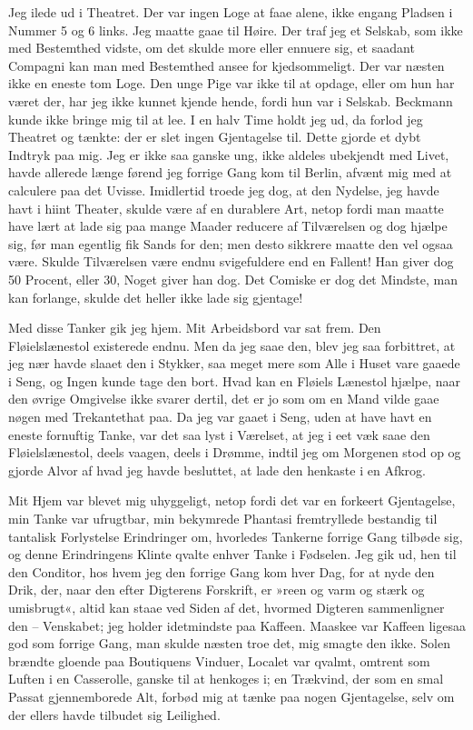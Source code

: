 \documentclass[12pt,a4paper]{article}
\begin{document}
Jeg ilede ud i Theatret. Der var ingen Loge at faae alene, ikke engang Pladsen i Nummer 5 og 6 links. Jeg maatte gaae til Høire. Der traf jeg et Selskab, som ikke med Bestemthed vidste, om det skulde more eller ennuere sig, et saadant Compagni kan man med Bestemthed ansee for kjedsommeligt. Der var næsten ikke en eneste tom Loge. Den unge Pige var ikke til at opdage, eller om hun har været der, har jeg ikke kunnet kjende hende, fordi hun var i Selskab. Beckmann kunde ikke bringe mig til at lee. I en halv Time holdt jeg ud, da forlod jeg Theatret og tænkte: der er slet ingen Gjentagelse til. Dette gjorde et dybt Indtryk paa mig. Jeg er ikke saa ganske ung, ikke aldeles ubekjendt med Livet, havde allerede længe førend jeg forrige Gang kom til Berlin, afvænt mig med at calculere paa det Uvisse. Imidlertid troede jeg dog, at den Nydelse, jeg havde havt i hiint Theater, skulde være af en durablere Art, netop fordi man maatte have lært at lade sig paa mange Maader reducere af Tilværelsen og dog hjælpe sig, før man egentlig fik Sands for den; men desto sikkrere maatte den vel ogsaa være. Skulde Tilværelsen være endnu svigefuldere end en Fallent! Han giver dog 50 Procent, eller 30, Noget giver han dog. Det Comiske er dog det Mindste, man kan forlange, skulde det heller ikke lade sig gjentage!

Med disse Tanker gik jeg hjem. Mit Arbeidsbord var sat frem. Den Fløielslænestol existerede endnu. Men da jeg saae den, blev jeg saa forbittret, at jeg nær havde slaaet den i Stykker, saa meget mere som Alle i Huset vare gaaede i Seng, og Ingen kunde tage den bort. Hvad kan en Fløiels Lænestol hjælpe, naar den øvrige Omgivelse ikke svarer dertil, det er jo som om en Mand vilde gaae nøgen med Trekantethat paa. Da jeg var gaaet i Seng, uden at have havt en eneste fornuftig Tanke, var det saa lyst i Værelset, at jeg i eet væk saae den Fløielslænestol, deels vaagen, deels i Drømme, indtil jeg om Morgenen stod op og gjorde Alvor af hvad jeg havde besluttet, at lade den henkaste i en Afkrog.

Mit Hjem var blevet mig uhyggeligt, netop fordi det var en forkeert Gjentagelse, min Tanke var ufrugtbar, min bekymrede Phantasi fremtryllede bestandig til tantalisk Forlystelse Erindringer om, hvorledes Tankerne forrige Gang tilbøde sig, og denne Erindringens Klinte qvalte enhver Tanke i Fødselen. Jeg gik ud, hen til den Conditor, hos hvem jeg den forrige Gang kom hver Dag, for at nyde den Drik, der, naar den efter Digterens Forskrift, er »reen og varm og stærk og umisbrugt«, altid kan staae ved Siden af det, hvormed Digteren sammenligner den – Venskabet; jeg holder idetmindste paa Kaffeen. Maaskee var Kaffeen ligesaa god som forrige Gang, man skulde næsten troe det, mig smagte den ikke. Solen brændte gloende paa Boutiquens Vinduer, Localet var qvalmt, omtrent som Luften i en Casserolle, ganske til at henkoges i; en Trækvind, der som en smal Passat gjennemborede Alt, forbød mig at tænke paa nogen Gjentagelse, selv om der ellers havde tilbudet sig Leilighed.
\end{document}
